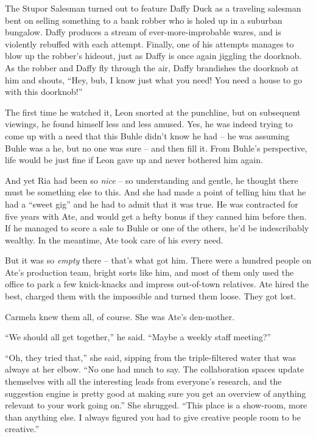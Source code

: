 \tb

The Stupor Salesman turned out to feature Daffy Duck as a traveling 
salesman bent on selling something to a bank robber who is holed up in 
a suburban bungalow. Daffy produces a stream of ever-more-improbable 
wares, and is violently rebuffed with each attempt. Finally, one of his 
attempts manages to blow up the robber's hideout, just as Daffy is once 
again jiggling the doorknob. As the robber and Daffy fly through the 
air, Daffy brandishes the doorknob at him and shouts, “Hey, bub, I 
know just what you need! You need a house to go with this doorknob!”

The first time he watched it, Leon snorted at the punchline, but on 
subsequent viewings, he found himself less and less amused. Yes, he was 
indeed trying to come up with a need that this Buhle didn't know he had 
-- he was assuming Buhle was a he, but no one was sure -- and then fill 
it. From Buhle's perspective, life would be just fine if Leon gave up 
and never bothered him again.

And yet Ria had been so \emph{nice} -- so understanding and gentle, he 
thought there must be something else to this. And she had made a point 
of telling him that he had a “sweet gig” and he had to admit that 
it was true. He was contracted for five years with Ate, and would get a 
hefty bonus if they canned him before then. If he managed to score a 
sale to Buhle or one of the others, he'd be indescribably wealthy. In 
the meantime, Ate took care of his every need.

But it was so \emph{empty} there -- that's what got him. There were a 
hundred people on Ate's production team, bright sorts like him, and 
most of them only used the office to park a few knick-knacks and 
impress out-of-town relatives. Ate hired the best, charged them with 
the impossible and turned them loose. They got lost.

Carmela knew them all, of course. She was Ate's den-mother.

“We should all get together,” he said. “Maybe a weekly staff 
meeting?”

“Oh, they tried that,” she said, sipping from the triple-filtered 
water that was always at her elbow. “No one had much to say. The 
collaboration spaces update themselves with all the interesting leads 
from everyone's research, and the suggestion engine is pretty good at 
making sure you get an overview of anything relevant to your work going 
on.” She shrugged. “This place is a show-room, more than anything 
else. I always figured you had to give creative people room to be 
creative.”

